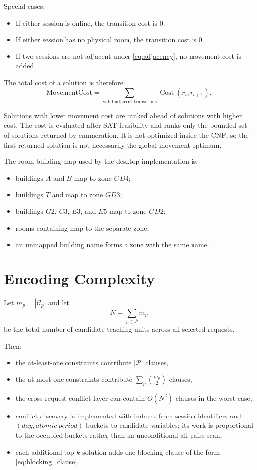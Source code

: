 \documentclass{article}
\newcommand{\Cost}{\operatorname{Cost}}
\begin{document}
Special cases:
\begin{itemize}
    \item If either session is online, the transition cost is $0$.
    \item If either session has no physical room, the transition cost is $0$.
    \item If two sessions are not adjacent under \eqref{eq:adjacency}, no movement cost is added.
\end{itemize}

The total cost of a solution is therefore:
\begin{equation}
\text{MovementCost} = \sum_{\text{valid adjacent transitions}} \Cost(r_i, r_{i+1}).
\end{equation}

Solutions with lower movement cost are ranked ahead of solutions with higher cost.
The cost is evaluated after SAT feasibility and ranks only the bounded set of
solutions returned by enumeration. It is not optimized inside the CNF, so the
first returned solution is not necessarily the global movement optimum.

The room-building map used by the desktop implementation is:
\begin{itemize}
    \item buildings $A$ and $B$ map to zone $GD4$;
    \item buildings $T$ and  map to zone $GD3$;
    \item buildings $G2$, $G3$, $E3$, and $E5$ map to zone $GD2$;
    \item rooms containing  map to the separate  zone;
    \item an unmapped building name forms a zone with the same name.
\end{itemize}

\section{Encoding Complexity}

Let $m_p = |\mathcal{C}_p|$ and let
\begin{equation}
N = \sum_{p \in \mathcal{P}} m_p
\end{equation}
be the total number of candidate teaching units across all selected requests.

Then:
\begin{itemize}
    \item the at-least-one constraints contribute $|\mathcal{P}|$ clauses,
    \item the at-most-one constraints contribute $\sum_p \binom{m_p}{2}$ clauses,
    \item the cross-request conflict layer can contain $O(N^2)$ clauses in the worst case,
    \item conflict discovery is implemented with indexes from session identifiers and
    $(day, atomic\ period)$ buckets to candidate variables; its work is proportional
    to the occupied buckets rather than an unconditional all-pairs scan,
    \item each additional top-$k$ solution adds one blocking clause of the form \eqref{eq:blocking_clause}.
\end{itemize}
\end{document}

